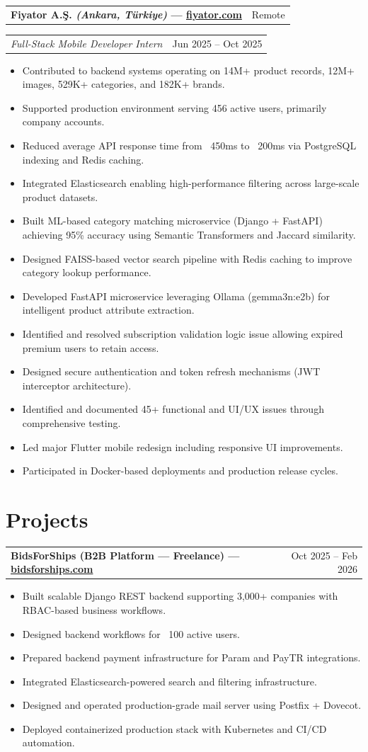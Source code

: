 \documentclass[10pt,a4paper]{extarticle}
\makeatletter
\newcommand{\entry}[2]{%
\noindent\begin{tabular*}{\textwidth}{@{\extracolsep{\fill}}lr}
\textbf{#1} & #2\\
\end{tabular*}
}
\newcommand{\subentry}[2]{%
\noindent\begin{tabular*}{\textwidth}{@{\extracolsep{\fill}}lr}
\textit{#1} & #2\\
\end{tabular*}
}
\makeatother
\begin{document}
\entry{Fiyator A.Ş. \textit{(Ankara, Türkiye)} \textnormal{---} \href{https://fiyator.com}{fiyator.com}}{Remote}
\subentry{Full-Stack Mobile Developer Intern}{Jun 2025 -- Oct 2025}
\begin{itemize}[leftmargin=*,noitemsep,topsep=0pt]
\item Contributed to backend systems operating on 14M+ product records, 12M+ images, 529K+ categories, and 182K+ brands.
\item Supported production environment serving 456 active users, primarily company accounts.
\item Reduced average API response time from ~450ms to ~200ms via PostgreSQL indexing and Redis caching.
\item Integrated Elasticsearch enabling high-performance filtering across large-scale product datasets.
\item Built ML-based category matching microservice (Django + FastAPI) achieving 95\% accuracy using Semantic Transformers and Jaccard similarity.
\item Designed FAISS-based vector search pipeline with Redis caching to improve category lookup performance.
\item Developed FastAPI microservice leveraging Ollama (gemma3n:e2b) for intelligent product attribute extraction.
\item Identified and resolved subscription validation logic issue allowing expired premium users to retain access.
\item Designed secure authentication and token refresh mechanisms (JWT interceptor architecture).
\item Identified and documented 45+ functional and UI/UX issues through comprehensive testing.
\item Led major Flutter mobile redesign including responsive UI improvements.
\item Participated in Docker-based deployments and production release cycles.
\end{itemize}

\section{Projects}

\entry{BidsForShips (B2B Platform — Freelance) \textnormal{---} \href{https://bidsforships.com}{bidsforships.com}}{Oct 2025 -- Feb 2026}
\begin{itemize}[leftmargin=*,noitemsep,topsep=0pt]
\item Built scalable Django REST backend supporting 3,000+ companies with RBAC-based business workflows.
\item Designed backend workflows for ~100 active users.
\item Prepared backend payment infrastructure for Param and PayTR integrations.
\item Integrated Elasticsearch-powered search and filtering infrastructure.
\item Designed and operated production-grade mail server using Postfix + Dovecot.
\item Deployed containerized production stack with Kubernetes and CI/CD automation.
\end{itemize}
\end{document}
